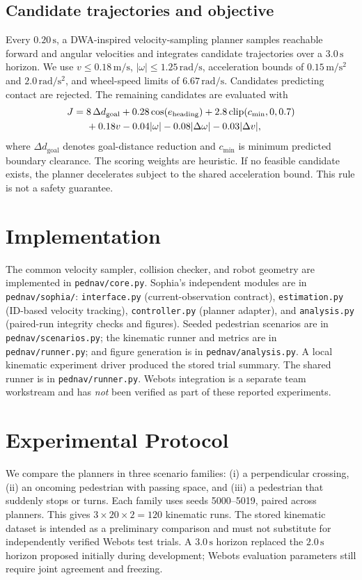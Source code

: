 \documentclass[11pt,a4paper]{article}
\newcommand{\methodname}{DWA-inspired velocity-sampling planner}
\begin{document}
\subsection{Candidate trajectories and objective}
Every \(0.20\,\mathrm{s}\), a \methodname{} samples reachable forward and angular velocities and integrates candidate trajectories over a \(3.0\,\mathrm{s}\) horizon. We use \(v\leq0.18\,\mathrm{m/s}\), \(|\omega|\leq1.25\,\mathrm{rad/s}\), acceleration bounds of \(0.15\,\mathrm{m/s^2}\) and \(2.0\,\mathrm{rad/s^2}\), and wheel-speed limits of \(6.67\,\mathrm{rad/s}\). Candidates predicting contact are rejected. The remaining candidates are evaluated with
\begin{align}
J ={}& 8\,\Delta d_{\mathrm{goal}} + 0.28\cos(e_{\mathrm{heading}})
+2.8\,\mathrm{clip}(c_{\min},0,0.7)\notag\\
&+0.18v-0.04|\omega|-0.08|\Delta\omega|-0.03|\Delta v|,
\label{eq:score}
\end{align}
where \(\Delta d_{\mathrm{goal}}\) denotes goal-distance reduction and \(c_{\min}\) is minimum predicted boundary clearance. The scoring weights are heuristic. If no feasible candidate exists, the planner decelerates subject to the shared acceleration bound. This rule is not a safety guarantee.

\section{Implementation}
The common velocity sampler, collision checker, and robot geometry are implemented in \texttt{pednav/core.py}. Sophia's independent modules are in \texttt{pednav/sophia/}: \texttt{interface.py} (current-observation contract), \texttt{estimation.py} (ID-based velocity tracking), \texttt{controller.py} (planner adapter), and \texttt{analysis.py} (paired-run integrity checks and figures). Seeded pedestrian scenarios are in \texttt{pednav/scenarios.py}; the kinematic runner and metrics are in \texttt{pednav/runner.py}; and figure generation is in \texttt{pednav/analysis.py}. A local kinematic experiment driver produced the stored trial summary. The shared runner is in \texttt{pednav/runner.py}. Webots integration is a separate team workstream and has \emph{not} been verified as part of these reported experiments.

\section{Experimental Protocol}
We compare the planners in three scenario families: (i) a perpendicular crossing, (ii) an oncoming pedestrian with passing space, and (iii) a pedestrian that suddenly stops or turns. Each family uses seeds 5000--5019, paired across planners. This gives \(3\times20\times2=120\) kinematic runs. The stored kinematic dataset is intended as a preliminary comparison and must not substitute for independently verified Webots test trials. A \(3.0\,\mathrm{s}\) horizon replaced the \(2.0\,\mathrm{s}\) horizon proposed initially during development; Webots evaluation parameters still require joint agreement and freezing.
\end{document}
